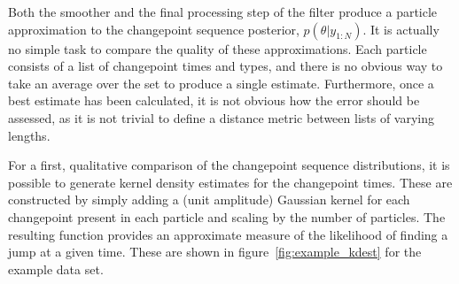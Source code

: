 \documentclass[journal]{IEEEtran}
\begin{document}
Both the smoother and the final processing step of the filter produce a particle approximation to the changepoint sequence posterior, $p(\theta|y_{1:N})$. It is actually no simple task to compare the quality of these approximations. Each particle consists of a list of changepoint times and types, and there is no obvious way to take an average over the set to produce a single estimate. Furthermore, once a best estimate has been calculated, it is not obvious how the error should be assessed, as it is not trivial to define a distance metric between lists of varying lengths.

For a first, qualitative comparison of the changepoint sequence distributions, it is possible to generate kernel density estimates for the changepoint times. These are constructed by simply adding a (unit amplitude) Gaussian kernel for each changepoint present in each particle and scaling by the number of particles. The resulting function provides an approximate measure of the likelihood of finding a jump at a given time. These are shown in figure~\ref{fig:example_kdest} for the example data set.
\end{document}
